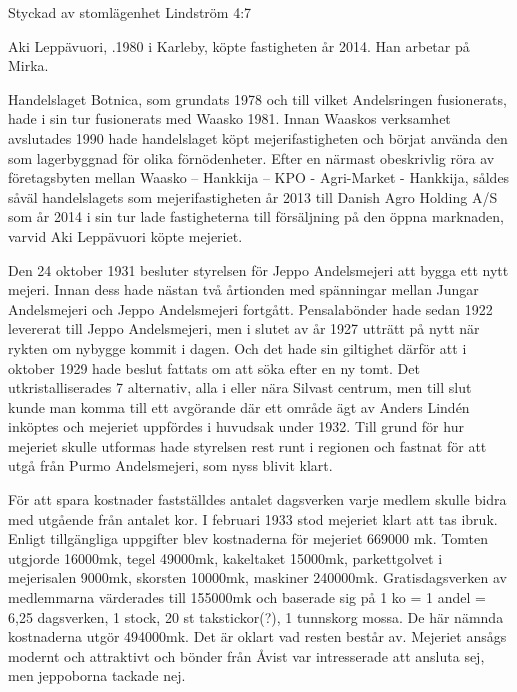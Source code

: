 Styckad av stomlägenhet Lindström 4:7


%
Aki Leppävuori, .1980 i Karleby, köpte fastigheten år 2014. Han arbetar på Mirka.\jhvspace{}


%
Handelslaget Botnica, som grundats 1978 och till vilket Andelsringen fusionerats, hade i sin tur fusionerats med Waasko 1981. Innan Waaskos verksamhet avslutades 1990 hade handelslaget köpt mejerifastigheten och börjat använda den som lagerbyggnad för olika förnödenheter. Efter en närmast obeskrivlig röra av företagsbyten mellan Waasko – Hankkija – KPO - Agri-Market - Hankkija, såldes såväl handelslagets som mejerifastigheten år 2013 till Danish Agro Holding A/S som år 2014 i sin tur lade fastigheterna till försäljning på den öppna marknaden, varvid Aki Leppävuori köpte mejeriet.


Den 24 oktober 1931 besluter styrelsen för Jeppo Andelsmejeri att bygga ett nytt mejeri. Innan dess hade nästan två årtionden med spänningar mellan Jungar Andelsmejeri och Jeppo Andelsmejeri fortgått. Pensalabönder hade sedan 1922 levererat till Jeppo Andelsmejeri, men i slutet av år 1927 utträtt på nytt när rykten om nybygge kommit i dagen. Och det hade sin giltighet därför att i oktober 1929 hade beslut fattats om att söka efter en ny tomt. Det utkristalliserades 7 alternativ, alla i eller nära Silvast centrum, men till slut kunde man komma till ett avgörande där ett område ägt av Anders Lindén inköptes och mejeriet uppfördes i huvudsak under 1932. Till grund för hur mejeriet skulle utformas hade styrelsen rest runt i regionen och fastnat för att utgå från Purmo Andelsmejeri, som nyss blivit klart.

För att spara kostnader fastställdes antalet dagsverken varje medlem skulle bidra med utgående från antalet kor. I februari 1933 stod mejeriet klart att tas ibruk. Enligt tillgängliga uppgifter blev kostnaderna för mejeriet 669000 mk. Tomten utgjorde 16000mk, tegel 49000mk, kakeltaket 15000mk, parkettgolvet i mejerisalen 9000mk, skorsten 10000mk, maskiner 240000mk. Gratisdagsverken av medlemmarna värderades till 155000mk och baserade sig på 1 ko = 1 andel = 6,25 dagsverken, 1 stock, 20 st takstickor(?), 1 tunnskorg mossa. De här nämnda kostnaderna utgör 494000mk. Det är oklart vad resten består av. Mejeriet ansågs modernt och attraktivt och bönder från Åvist var intresserade att ansluta sej, men jeppoborna tackade nej.

